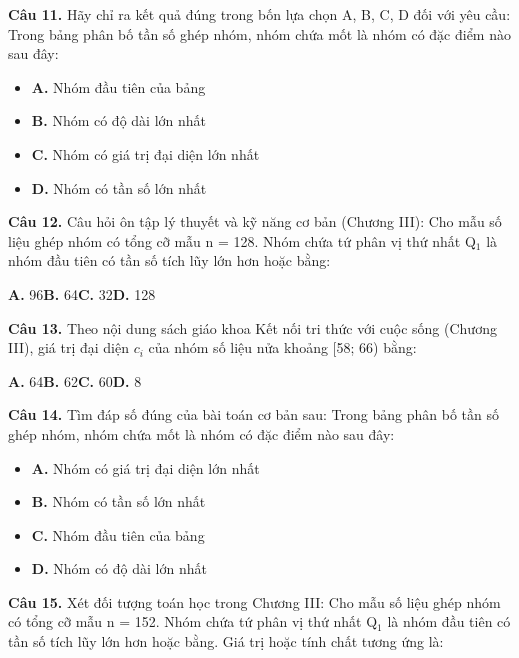\documentclass[11pt,a4paper]{article}
\begin{document}
\textbf{\color{primary} Câu 11.} Hãy chỉ ra kết quả đúng trong bốn lựa chọn A, B, C, D đối với yêu cầu: Trong bảng phân bố tần số ghép nhóm, nhóm chứa mốt là nhóm có đặc điểm nào sau đây:\par
\begin{itemize}\setlength{\itemsep}{1pt}\setlength{\parskip}{0pt}
  \item[] \textbf{A.} Nhóm đầu tiên của bảng
  \item[] \textbf{B.} Nhóm có độ dài lớn nhất
  \item[] \textbf{C.} Nhóm có giá trị đại diện lớn nhất
  \item[] \textbf{D.} Nhóm có tần số lớn nhất
\end{itemize}\vspace{2pt}
\textbf{\color{primary} Câu 12.} Câu hỏi ôn tập lý thuyết và kỹ năng cơ bản (Chương III): Cho mẫu số liệu ghép nhóm có tổng cỡ mẫu n = 128. Nhóm chứa tứ phân vị thứ nhất Q$_1$ là nhóm đầu tiên có tần số tích lũy lớn hơn hoặc bằng:\par
\hspace*{1.5em}\textbf{A.} 96\quad\quad \textbf{B.} 64\quad\quad \textbf{C.} 32\quad\quad \textbf{D.} 128\par\vspace{2pt}
\textbf{\color{primary} Câu 13.} Theo nội dung sách giáo khoa Kết nối tri thức với cuộc sống (Chương III), giá trị đại diện $c_i$ của nhóm số liệu nửa khoảng [58; 66) bằng:\par
\hspace*{1.5em}\textbf{A.} 64\quad\quad \textbf{B.} 62\quad\quad \textbf{C.} 60\quad\quad \textbf{D.} 8\par\vspace{2pt}
\textbf{\color{primary} Câu 14.} Tìm đáp số đúng của bài toán cơ bản sau: Trong bảng phân bố tần số ghép nhóm, nhóm chứa mốt là nhóm có đặc điểm nào sau đây:\par
\begin{itemize}\setlength{\itemsep}{1pt}\setlength{\parskip}{0pt}
  \item[] \textbf{A.} Nhóm có giá trị đại diện lớn nhất
  \item[] \textbf{B.} Nhóm có tần số lớn nhất
  \item[] \textbf{C.} Nhóm đầu tiên của bảng
  \item[] \textbf{D.} Nhóm có độ dài lớn nhất
\end{itemize}\vspace{2pt}
\textbf{\color{primary} Câu 15.} Xét đối tượng toán học trong Chương III: Cho mẫu số liệu ghép nhóm có tổng cỡ mẫu n = 152. Nhóm chứa tứ phân vị thứ nhất Q$_1$ là nhóm đầu tiên có tần số tích lũy lớn hơn hoặc bằng. Giá trị hoặc tính chất tương ứng là:\par
\end{document}
